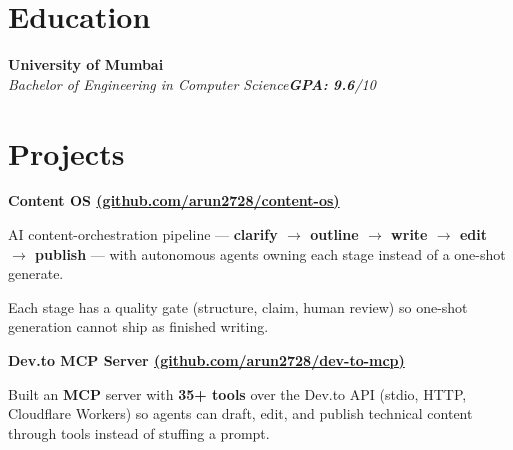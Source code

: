 \documentclass[letterpaper,10pt]{article}
\newcommand{\heading}[2]{
  \hspace{10pt}#1\hfill#2\\
}
\newcommand{\headingBf}[2]{
  \heading{\textbf{#1}}{\textbf{#2}}
}
\newcommand{\headingIt}[2]{
  \heading{\textit{#1}}{\textit{#2}}
}
\newenvironment{resume_list}{
  \vspace{-7pt}
  \begin{itemize}[itemsep=-2px, parsep=1pt, leftmargin=30pt]
}{
  \end{itemize}
}
\begin{document}

  \section{Education}

  \headingBf{University of Mumbai}{} %
  \headingIt{Bachelor of Engineering in Computer Science}{\textbf{GPA:} \textbf{9.6}/10}



  \section{Projects}


  \headingBf{Content OS \href{https://github.com/arun2728/content-os}{(github.com/arun2728/content-os)} }{}
  \begin{resume_list}
    \item AI content-orchestration pipeline --- \textbf{clarify $\rightarrow$ outline $\rightarrow$ write $\rightarrow$ edit $\rightarrow$ publish} --- with autonomous agents owning each stage instead of a one-shot generate.
    \item Each stage has a quality gate (structure, claim, human review) so one-shot generation cannot ship as finished writing.
  \end{resume_list}

  \headingBf{Dev.to MCP Server \href{https://github.com/arun2728/dev-to-mcp}{(github.com/arun2728/dev-to-mcp)} }{}
  \begin{resume_list}
    \item Built an \textbf{MCP} server with \textbf{35+ tools} over the Dev.to API (stdio, HTTP, Cloudflare Workers) so agents can draft, edit, and publish technical content through tools instead of stuffing a prompt.
  \end{resume_list}
\end{document}
